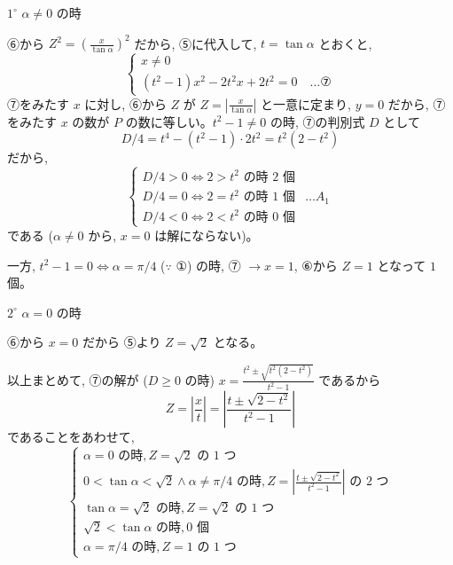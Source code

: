 \documentclass[../main.tex]{subfiles}
\begin{document}
$1^\circ$ $\alpha \neq 0$ の時

⑥から $Z^2 = \left( \frac{x}{\tan\alpha} \right)^2$ だから, ⑤に代入して, $t = \tan\alpha$ とおくと,
\[
  \begin{cases}
    x \neq 0 \\
    (t^2-1) x^2 - 2t^2 x + 2t^2 = 0 \quad \dots \text{⑦}
  \end{cases}
\]
⑦をみたす $x$ に対し, ⑥から $Z$ が $Z = \left|\frac{x}{\tan\alpha}\right|$ と一意に定まり, $y=0$ だから, ⑦をみたす $x$ の数が $P$ の数に等しい。$t^2 - 1 \neq 0$ の時, ⑦の判別式 $D$ として
\[
  D/4 = t^4 - (t^2-1) \cdot 2t^2 = t^2 (2 - t^2)
\]
だから,
\[
  \begin{cases}
    D/4 > 0 \iff 2 > t^2 \text{ の時 } 2 \text{ 個} \\
    D/4 = 0 \iff 2 = t^2 \text{ の時 } 1 \text{ 個} & \dots A_1 \\
    D/4 < 0 \iff 2 < t^2 \text{ の時 } 0 \text{ 個}
  \end{cases}
\]
である ($\alpha \neq 0$ から, $x=0$ は解にならない)。

一方, $t^2 - 1 = 0 \iff \alpha = \pi/4$ ($\because$ ①) の時, ⑦ $\to x = 1$, ⑥から $Z=1$ となって $1$ 個。

$2^\circ$ $\alpha = 0$ の時

⑥から $x=0$ だから ⑤より $Z = \sqrt{2}$ となる。

以上まとめて, ⑦の解が ($D \ge 0$ の時) $x = \frac{t^2 \pm \sqrt{t^2(2-t^2)}}{t^2 - 1}$ であるから
\[
  Z = \left| \frac{x}{t} \right| = \left| \frac{t \pm \sqrt{2-t^2}}{t^2 - 1} \right|
\]
であることをあわせて,
\[
  \begin{cases}
    \alpha = 0 \text{ の時}, Z = \sqrt{2} \text{ の } 1 \text{ つ} \\
    0 < \tan\alpha < \sqrt{2} \land \alpha \neq \pi/4 \text{ の時}, Z = \left| \frac{t \pm \sqrt{2-t^2}}{t^2 - 1} \right| \text{ の } 2 \text{ つ} \\
    \tan\alpha = \sqrt{2} \text{ の時}, Z = \sqrt{2} \text{ の } 1 \text{ つ} \\
    \sqrt{2} < \tan\alpha \text{ の時}, 0 \text{ 個} \\
    \alpha = \pi/4 \text{ の時}, Z = 1 \text{ の } 1 \text{ つ}
  \end{cases}
\]
\end{document}
